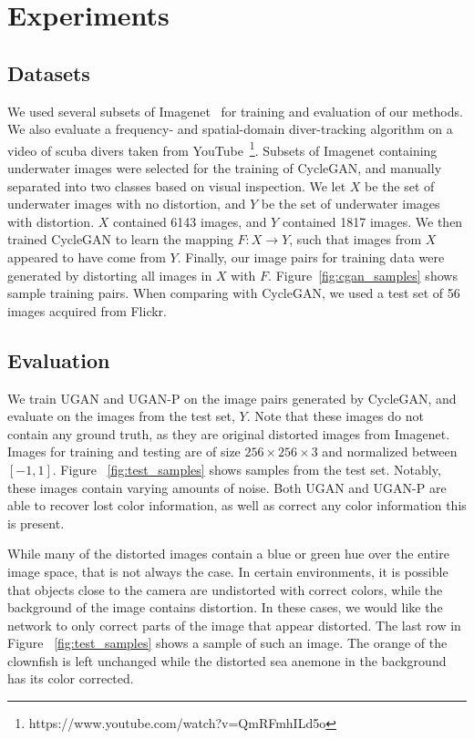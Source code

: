 \section{Experiments}
\label{sec:experiments}

\subsection{Datasets}
We used several subsets of Imagenet~\cite{deng2009imagenet} for training and evaluation of our methods. We also evaluate a 
frequency- and spatial-domain diver-tracking algorithm on a video of scuba divers taken from YouTube\texttrademark\ 
\footnote{https://www.youtube.com/watch?v=QmRFmhILd5o}. Subsets of 
Imagenet
containing underwater images were selected for the training of CycleGAN, and manually separated into two classes based on visual
inspection. We let $X$ be the set of underwater images with no distortion, and $Y$ be the set of underwater images with 
distortion. $X$
contained 6143 images, and $Y$ contained 1817 images. We then trained CycleGAN to learn the mapping $F: X \rightarrow Y$, such 
that images
from $X$ appeared to have come from $Y$. Finally, our image pairs for training data were generated by distorting all images in $X$ 
with
$F$. Figure~\ref{fig:cgan_samples} shows sample training pairs. When comparing with CycleGAN, we used a test set of 56 images 
acquired from
Flickr\texttrademark .

\subsection{Evaluation}
We train UGAN and UGAN-P on the image pairs generated by CycleGAN, and evaluate on the images from the
test set, $Y$. Note that these images do not contain any ground truth, as they are original distorted images from
Imagenet. Images for training and testing are of size $256 \times 256 \times 3$ and normalized between $[-1, 1]$.
Figure ~\ref{fig:test_samples} shows samples from the test set. Notably, these images contain varying amounts of noise. Both UGAN 
and UGAN-P
are able to recover lost color information, as well as correct any color information this is present. 

While many of the distorted images contain a blue or green hue over the entire image space, that is not always the case.
In certain environments,
it is possible that objects close to the camera are undistorted with correct colors, while the background
of the image contains distortion. In these cases, we would like the network to only correct parts of the image that
appear distorted. The last row in Figure ~\ref{fig:test_samples} shows a sample of such an image. The orange of the clownfish is 
left
unchanged while the distorted sea anemone in the background has its color corrected.

